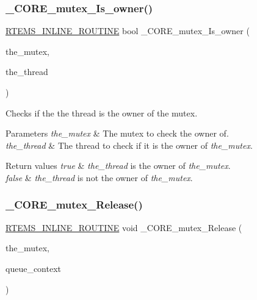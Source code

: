 \subsubsection{\texorpdfstring{\_CORE\_mutex\_Is\_owner()}{\_CORE\_mutex\_Is\_owner()}}
{\footnotesize\ttfamily \mbox{\hyperlink{group__RTEMSScoreBaseDefs_gac216239df231d5dbd15e3520b0b9313f}{R\+T\+E\+M\+S\+\_\+\+I\+N\+L\+I\+N\+E\+\_\+\+R\+O\+U\+T\+I\+NE}} bool \+\_\+\+C\+O\+R\+E\+\_\+mutex\+\_\+\+Is\+\_\+owner (\begin{DoxyParamCaption}\item[{const \mbox{\hyperlink{structCORE__mutex__Control}{C\+O\+R\+E\+\_\+mutex\+\_\+\+Control}} $\ast$}]{the\+\_\+mutex,  }\item[{const \mbox{\hyperlink{struct__Thread__Control}{Thread\+\_\+\+Control}} $\ast$}]{the\+\_\+thread }\end{DoxyParamCaption})}



Checks if the the thread is the owner of the mutex. 


\begin{DoxyParams}{Parameters}
{\em the\+\_\+mutex} & The mutex to check the owner of. \\
\hline
{\em the\+\_\+thread} & The thread to check if it is the owner of {\itshape the\+\_\+mutex}.\\
\hline
\end{DoxyParams}

\begin{DoxyRetVals}{Return values}
{\em true} & {\itshape the\+\_\+thread} is the owner of {\itshape the\+\_\+mutex}. \\
\hline
{\em false} & {\itshape the\+\_\+thread} is not the owner of {\itshape the\+\_\+mutex}. \\
\hline
\end{DoxyRetVals}
\mbox{\label{group__RTEMSScoreMutex_ga0bb76a8a25cab71b0fdaa1f7b215f809}} 
\subsubsection{\texorpdfstring{\_CORE\_mutex\_Release()}{\_CORE\_mutex\_Release()}}
{\footnotesize\ttfamily \mbox{\hyperlink{group__RTEMSScoreBaseDefs_gac216239df231d5dbd15e3520b0b9313f}{R\+T\+E\+M\+S\+\_\+\+I\+N\+L\+I\+N\+E\+\_\+\+R\+O\+U\+T\+I\+NE}} void \+\_\+\+C\+O\+R\+E\+\_\+mutex\+\_\+\+Release (\begin{DoxyParamCaption}\item[{\mbox{\hyperlink{structCORE__mutex__Control}{C\+O\+R\+E\+\_\+mutex\+\_\+\+Control}} $\ast$}]{the\+\_\+mutex,  }\item[{\mbox{\hyperlink{structThread__queue__Context}{Thread\+\_\+queue\+\_\+\+Context}} $\ast$}]{queue\+\_\+context }\end{DoxyParamCaption})}



